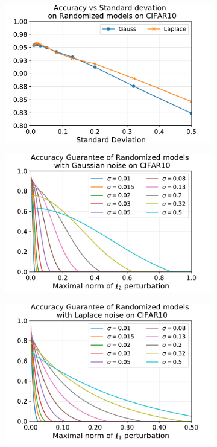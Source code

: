 \begin{figure}[htb]
  \centering
  \begin{subfigure}[t]{0.31\textwidth}
      \centering
      \includegraphics[scale=0.32]{figures/appendix3/acc_sd_CIFAR10.pdf}
      \caption{}
      \label{figure:ap3-acc_sd_CIFAR10}
  \end{subfigure}
  \begin{subfigure}[t]{0.31\textwidth}
      \centering
      \includegraphics[scale=0.32]{figures/appendix3/gauss_certif_CIFAR10.pdf}
      \caption{}
      \label{figure:ap3-gauss_certif_CIFAR10}
  \end{subfigure}
  \begin{subfigure}[t]{0.31\textwidth}
      \centering
      \includegraphics[scale=0.32]{figures/appendix3/laplace_certif_CIFAR10.pdf}

\end{subfigure}
\end{figure}
